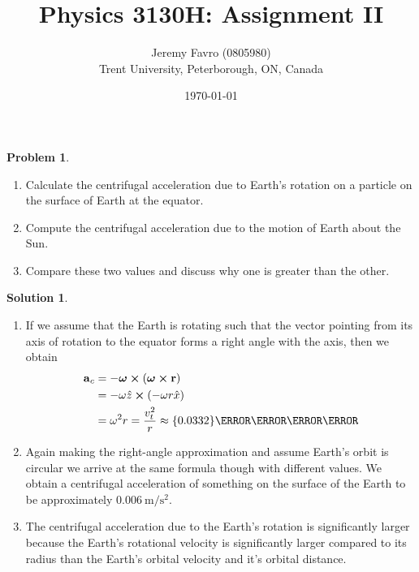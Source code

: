\documentclass[10pt]{article}
\title{Physics 3130H: Assignment II}
\author{Jeremy Favro (0805980) \\ Trent University, Peterborough, ON, Canada}
\date{\today}
\theoremstyle{definition}
\newtheorem{problem}{Problem}
\newtheorem{soln}{Solution}
\newcommand{\ux}{\hat{x}}
\newcommand{\uz}{\hat{z}}
\newcommand{\bv}[1]{\bm{\mathrm{#1}}}
\begin{document}
\maketitle

\begin{problem}~
\begin{enumerate}[label=(\roman*)]
  \item Calculate the centrifugal acceleration due to Earth's rotation on a particle on the surface of Earth at the equator.
  \item Compute the centrifugal acceleration due to the motion of Earth about the Sun.
  \item Compare these two values and discuss why one is greater than the other.
\end{enumerate}
\end{problem}
\begin{soln}~
  \begin{enumerate}[label=(\roman*)]
    \item If we assume that the Earth is rotating such that the vector pointing from its axis of rotation to the equator forms a right angle with
          the axis, then we obtain
          \begin{align*}
            \bv{a}_c & =-\bv{\omega}\cross(\bv{\omega}\cross\bv{r})                              \\
                     & =-\omega\uz\cross(-\omega r\ux)                                           \\
                     & =\omega^2r=\frac{v_t^2}{r}\approx \qty{0.0332}{\meter\per\second\squared}
          \end{align*}
    \item Again making the right-angle approximation and assume Earth's orbit is circular we arrive at the same formula though with different values.
          We obtain a centrifugal acceleration of something on the surface of the Earth to be approximately $\qty{0.006}{\meter\per\second\squared}$.
    \item The centrifugal acceleration due to the Earth's rotation is significantly larger because the Earth's rotational velocity is significantly larger compared
          to its radius than the Earth's orbital velocity and it's orbital distance.
  \end{enumerate}
\end{soln}
\newpage
\end{document}
